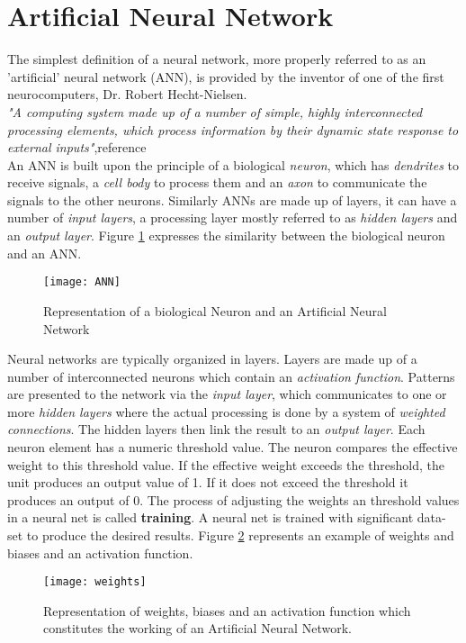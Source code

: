 \section{Artificial Neural Network}
The simplest definition of a neural network, more properly referred to as an 'artificial' neural network (ANN), is provided by the inventor of one of the first neurocomputers, Dr. Robert Hecht-Nielsen.\\
\textit{"A computing system made up of a number of simple, highly interconnected processing elements, which process information by their dynamic state response to external inputs"},reference \citet{caudill1987neural}\\
An ANN is built upon the principle of a biological \textit{neuron}, which has \textit{dendrites} to receive signals, a \textit{cell body} to process them and an \textit{axon} to communicate the signals to the other neurons. Similarly ANNs are made up of layers, it can have a number of \textit{input layers}, a processing layer mostly referred to as \textit{hidden layers} and an \textit{output layer}. Figure \ref{fig:2.10} expresses the similarity between the biological neuron and an ANN.\\
\begin{figure}[h]
 \centering
 \texttt{[image: ANN]}
 \caption{Representation of a biological Neuron and an Artificial Neural Network}
 \label{fig:2.10}
\end{figure}
Neural networks are typically organized in layers. Layers are made up of a number of interconnected neurons which contain an \textit{activation function}. Patterns are presented to the network via the \textit{input layer}, which communicates to one or more \textit{hidden layers} where the actual processing is done by a system of \textit{weighted connections}. The hidden layers then link the result to an \textit{output layer}. Each neuron element has a numeric threshold value. The neuron compares the effective weight to this threshold value. If the effective weight exceeds the threshold, the unit produces an output value of 1. If it does not exceed the threshold it produces an output of 0. The process of adjusting the weights an threshold values in a neural net is called \textbf{training}. A neural net is trained with significant data-set to produce the desired results. Figure \ref{fig:2.11} represents an example of weights and biases and an activation function.\\
\begin{figure}[h]
 \centering
 \texttt{[image: weights]}
 \caption{Representation of weights, biases and an activation function which constitutes the working of an Artificial Neural Network.}
 \label{fig:2.11}
\end{figure}
